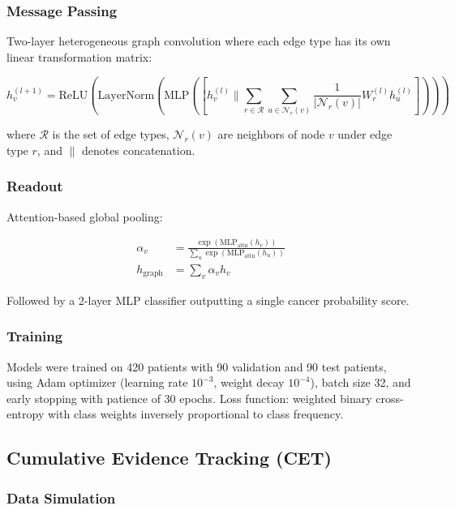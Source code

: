 \documentclass[10pt,a4paper]{article}
\begin{document}
\subsubsection{Message Passing}

Two-layer heterogeneous graph convolution where each edge type has its own linear transformation matrix:

\begin{equation}
h_v^{(l+1)} = \text{ReLU}\left(\text{LayerNorm}\left(\text{MLP}\left( \left[ h_v^{(l)} \| \sum_{r \in \mathcal{R}} \sum_{u \in \mathcal{N}_r(v)} \frac{1}{|\mathcal{N}_r(v)|} W_r^{(l)} h_u^{(l)} \right] \right)\right)\right)
\end{equation}

where $\mathcal{R}$ is the set of edge types, $\mathcal{N}_r(v)$ are neighbors of node $v$ under edge type $r$, and $\|$ denotes concatenation.

\subsubsection{Readout}

Attention-based global pooling:

\begin{align}
\alpha_v &= \frac{\exp(\text{MLP}_{\text{attn}}(h_v))}{\sum_{u} \exp(\text{MLP}_{\text{attn}}(h_u))} \\
h_{\text{graph}} &= \sum_v \alpha_v h_v
\end{align}

Followed by a 2-layer MLP classifier outputting a single cancer probability score.

\subsubsection{Training}

Models were trained on 420 patients with 90 validation and 90 test patients, using Adam optimizer (learning rate $10^{-3}$, weight decay $10^{-4}$), batch size 32, and early stopping with patience of 30 epochs. Loss function: weighted binary cross-entropy with class weights inversely proportional to class frequency.

\subsection{Cumulative Evidence Tracking (CET)}

\subsubsection{Data Simulation}
\end{document}
